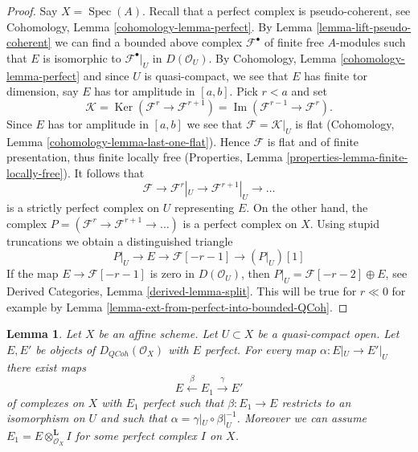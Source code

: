 \documentclass{stacks-project}
\theoremstyle{plain}
\newtheorem{lemma}[subsection]{Lemma}
\theoremstyle{definition}
\theoremstyle{remark}
\numberwithin{equation}{subsection}
\def\Spec{\mathop{\mathrm{Spec}}}
\def\QCoh{\mathit{QCoh}}
\def\Ker{\mathop{\mathrm{Ker}}}
\def\Im{\mathop{\mathrm{Im}}}
\begin{document}
\begin{proof}
Say $X = \Spec(A)$. Recall that a perfect complex is
pseudo-coherent, see
Cohomology, Lemma \ref{cohomology-lemma-perfect}.
By Lemma \ref{lemma-lift-pseudo-coherent} we can find a bounded above complex
$\mathcal{F}^\bullet$ of finite free $A$-modules such that $E$ is
isomorphic to $\mathcal{F}^\bullet|_U$ in $D(\mathcal{O}_U)$.
By Cohomology, Lemma \ref{cohomology-lemma-perfect} and since
$U$ is quasi-compact, we see that $E$ has finite tor dimension, say
$E$ has tor amplitude in $[a, b]$. Pick $r < a$ and set
$$
\mathcal{K} = \Ker(\mathcal{F}^{r} \to \mathcal{F}^{r + 1})
= \Im(\mathcal{F}^{r - 1} \to \mathcal{F}^r).
$$
Since $E$ has tor amplitude in $[a, b]$ we see that
$\mathcal{F} = \mathcal{K}|_U$ is
flat (Cohomology, Lemma \ref{cohomology-lemma-last-one-flat}).
Hence $\mathcal{F}$ is flat and of finite presentation, thus finite
locally free (Properties, Lemma \ref{properties-lemma-finite-locally-free}).
It follows that
$$
\mathcal{F} \to \mathcal{F}^r|_U \to \mathcal{F}^{r + 1}|_U \to \ldots
$$
is a strictly perfect complex on $U$ representing $E$. On the other hand,
the complex $P = (\mathcal{F}^r \to \mathcal{F}^{r + 1} \to \ldots )$
is a perfect complex on $X$. Using
stupid truncations we obtain a distinguished triangle
$$
P|_U \to E \to \mathcal{F}[-r - 1] \to (P|_U)[1]
$$
If the map $E \to \mathcal{F}[-r - 1]$ is zero in $D(\mathcal{O}_U)$,
then $P|_U = \mathcal{F}[-r - 2] \oplus E$, see
Derived Categories, Lemma \ref{derived-lemma-split}.
This will be true for $r \ll 0$ for example by
Lemma \ref{lemma-ext-from-perfect-into-bounded-QCoh}.
\end{proof}

\begin{lemma}
\label{lemma-lift-map}
Let $X$ be an affine scheme. Let $U \subset X$ be a quasi-compact open.
Let $E, E'$ be objects of $D_\QCoh(\mathcal{O}_X)$ with $E$ perfect.
For every map $\alpha : E|_U \to E'|_U$ there exist maps
$$
E \xleftarrow{\beta} E_1 \xrightarrow{\gamma} E'
$$
of complexes on $X$ with $E_1$ perfect such that $\beta : E_1 \to E$
restricts to an isomorphism on $U$ and such that
$\alpha = \gamma|_U \circ \beta|_U^{-1}$.
Moreover we can assume $E_1 = E \otimes_{\mathcal{O}_X}^\mathbf{L} I$
for some perfect complex $I$ on $X$.
\end{lemma}
\end{document}
